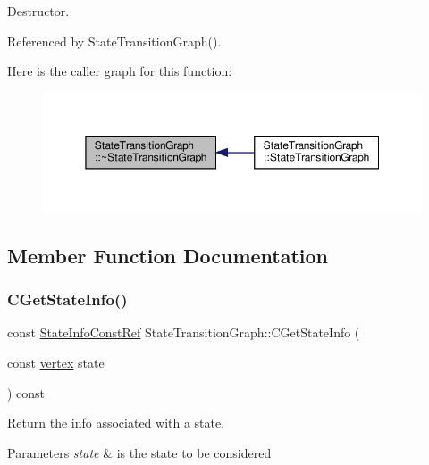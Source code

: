 Destructor. 



Referenced by State\+Transition\+Graph().

Here is the caller graph for this function\+:
\nopagebreak
\begin{figure}[H]
\begin{center}
\leavevmode
\includegraphics[width=350pt]{d9/d86/structStateTransitionGraph_af1d4a97008d17198f4f7d7f80466c57a_icgraph}
\end{center}
\end{figure}


\subsection{Member Function Documentation}
\mbox{\label{structStateTransitionGraph_a74d280e7a12edb40d1fa6a6d9bfd44c3}} 
\subsubsection{\texorpdfstring{C\+Get\+State\+Info()}{CGetStateInfo()}\hspace{0.1cm}{\footnotesize\ttfamily [1/2]}}
{\footnotesize\ttfamily const \hyperlink{state__transition__graph_8hpp_a50240fded93adab729e333c2b8090a8b}{State\+Info\+Const\+Ref} State\+Transition\+Graph\+::\+C\+Get\+State\+Info (\begin{DoxyParamCaption}\item[{const \hyperlink{graph_8hpp_abefdcf0544e601805af44eca032cca14}{vertex}}]{state }\end{DoxyParamCaption}) const\hspace{0.3cm}{\ttfamily [inline]}}



Return the info associated with a state. 


\begin{DoxyParams}{Parameters}
{\em state} & is the state to be considered \\
\hline
\end{DoxyParams}


